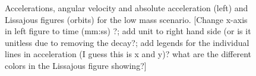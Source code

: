 \documentclass{article}
\begin{document}
\begin{figure}[ht]
\begin{subfigure}[b]{0.45\textwidth}
        \caption{}
        \label{fig:low-mass:orbit}
    \end{subfigure}
    
    \caption{Accelerations, angular velocity and absolute acceleration (left) and Lissajous figures (orbits) for the low mass scenario. [Change x-axis in left figure to time (mm:ss) ?; add  unit to right hand side (or is it unitless due to removing the decay?; add legends for the individual lines in acceleration (I guess this is x and y)? what are the different colors in the Lissajous figure showing?]}
    \label{fig:low-mass}
\end{figure}

\end{document}
